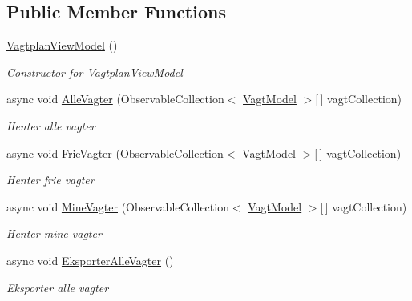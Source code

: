 \subsection*{Public Member Functions}
\begin{DoxyCompactItemize}
\item 
\hyperlink{class__1aarsproeve_1_1_view_model_1_1_vagtplan_view_model_a9cd0dee8f4da04199f5fd0dde63cbcda}{Vagtplan\+View\+Model} ()
\begin{DoxyCompactList}\small\item\em Constructor for \hyperlink{class__1aarsproeve_1_1_view_model_1_1_vagtplan_view_model}{Vagtplan\+View\+Model} \end{DoxyCompactList}\item 
async void \hyperlink{class__1aarsproeve_1_1_view_model_1_1_vagtplan_view_model_a56a741e7ac28ca395e584fc1a75688e7}{Alle\+Vagter} (Observable\+Collection$<$ \hyperlink{class__1aarsproeve_1_1_model_1_1_vagt_model}{Vagt\+Model} $>$\mbox{[}$\,$\mbox{]} vagt\+Collection)
\begin{DoxyCompactList}\small\item\em Henter alle vagter \end{DoxyCompactList}\item 
async void \hyperlink{class__1aarsproeve_1_1_view_model_1_1_vagtplan_view_model_a2e0b9cc312790efff77696437e15ba77}{Frie\+Vagter} (Observable\+Collection$<$ \hyperlink{class__1aarsproeve_1_1_model_1_1_vagt_model}{Vagt\+Model} $>$\mbox{[}$\,$\mbox{]} vagt\+Collection)
\begin{DoxyCompactList}\small\item\em Henter frie vagter \end{DoxyCompactList}\item 
async void \hyperlink{class__1aarsproeve_1_1_view_model_1_1_vagtplan_view_model_a19b7c651f229125edd8b1b2033c8aadf}{Mine\+Vagter} (Observable\+Collection$<$ \hyperlink{class__1aarsproeve_1_1_model_1_1_vagt_model}{Vagt\+Model} $>$\mbox{[}$\,$\mbox{]} vagt\+Collection)
\begin{DoxyCompactList}\small\item\em Henter mine vagter \end{DoxyCompactList}\item 
async void \hyperlink{class__1aarsproeve_1_1_view_model_1_1_vagtplan_view_model_aded65e8a981ff4dd63e1a583ef3da9cd}{Eksporter\+Alle\+Vagter} ()
\begin{DoxyCompactList}\small\item\em Eksporter alle vagter \end{DoxyCompactList}\item 

\end{DoxyCompactItemize}
